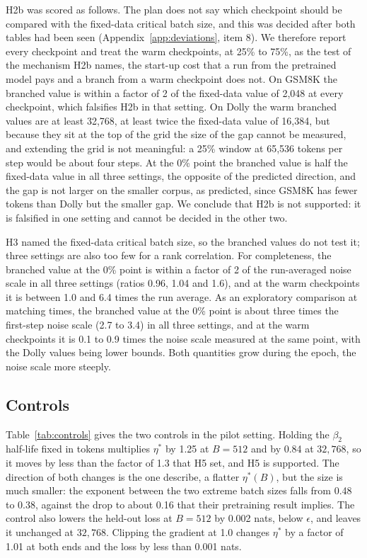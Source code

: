 \documentclass[10pt]{article}
\begin{document}
H2b was scored as follows. The plan does not say which checkpoint should be compared with the fixed-data critical batch size, and this was decided after both tables had been seen (Appendix~\ref{app:deviations}, item 8). We therefore report every checkpoint and treat the warm checkpoints, at 25\% to 75\%, as the test of the mechanism H2b names, the start-up cost that a run from the pretrained model pays and a branch from a warm checkpoint does not. On GSM8K the branched value is within a factor of 2 of the fixed-data value of 2,048 at every checkpoint, which falsifies H2b in that setting. On Dolly the warm branched values are at least 32,768, at least twice the fixed-data value of 16,384, but because they sit at the top of the grid the size of the gap cannot be measured, and extending the grid is not meaningful: a 25\% window at 65,536 tokens per step would be about four steps. At the 0\% point the branched value is half the fixed-data value in all three settings, the opposite of the predicted direction, and the gap is not larger on the smaller corpus, as predicted, since GSM8K has fewer tokens than Dolly but the smaller gap. We conclude that H2b is not supported: it is falsified in one setting and cannot be decided in the other two.

H3 named the fixed-data critical batch size, so the branched values do not test it; three settings are also too few for a rank correlation. For completeness, the branched value at the 0\% point is within a factor of 2 of the run-averaged noise scale in all three settings (ratios 0.96, 1.04 and 1.6), and at the warm checkpoints it is between 1.0 and 6.4 times the run average. As an exploratory comparison at matching times, the branched value at the 0\% point is about three times the first-step noise scale (2.7 to 3.4) in all three settings, and at the warm checkpoints it is 0.1 to 0.9 times the noise scale measured at the same point, with the Dolly values being lower bounds. Both quantities grow during the epoch, the noise scale more steeply.

\subsection{Controls}\label{sec:controls}

Table~\ref{tab:controls} gives the two controls in the pilot setting. Holding the $\beta_2$ half-life fixed in tokens multiplies $\eta^*$ by 1.25 at $B = 512$ and by 0.84 at $32{,}768$, so it moves by less than the factor of 1.3 that H5 set, and H5 is supported. The direction of both changes is the one \citet{marek2025} describe, a flatter $\eta^*(B)$, but the size is much smaller: the exponent between the two extreme batch sizes falls from 0.48 to 0.38, against the drop to about 0.16 that their pretraining result implies. The control also lowers the held-out loss at $B = 512$ by 0.002 nats, below $\epsilon$, and leaves it unchanged at $32{,}768$. Clipping the gradient at 1.0 changes $\eta^*$ by a factor of 1.01 at both ends and the loss by less than 0.001 nats.
\end{document}
